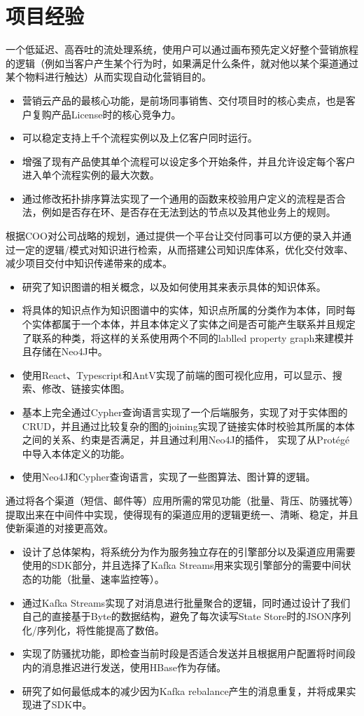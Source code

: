\documentclass{resume}
\begin{document}
\section{项目经验}
一个低延迟、高吞吐的流处理系统，使用户可以通过画布预先定义好整个营销旅程的逻辑（例如当客户产生某个行为时，如果满足什么条件，就对他以某个渠道通过某个物料进行触达）从而实现自动化营销目的。
\begin{itemize}[parsep=0.25ex]
\item 营销云产品的最核心功能，是前场同事销售、交付项目时的核心卖点，也是客户复购产品License时的核心竞争力。
\item 可以稳定支持上千个流程实例以及上亿客户同时运行。
\item 增强了现有产品使其单个流程可以设定多个开始条件，并且允许设定每个客户进入单个流程实例的最大次数。
\item 通过修改拓扑排序算法实现了一个通用的函数来校验用户定义的流程是否合法，例如是否存在环、是否存在无法到达的节点以及其他业务上的规则。
\end{itemize}
根据COO对公司战略的规划，通过提供一个平台让交付同事可以方便的录入并通过一定的逻辑/模式对知识进行检索，从而搭建公司知识库体系，优化交付效率、减少项目交付中知识传递带来的成本。
\begin{itemize}[parsep=0.25ex]
\item 研究了知识图谱的相关概念，以及如何使用其来表示具体的知识体系。
\item 将具体的知识点作为知识图谱中的实体，知识点所属的分类作为本体，同时每个实体都属于一个本体，并且本体定义了实体之间是否可能产生联系并且规定了联系的种类，将这样的关系使用两个不同的lablled property graph来建模并且存储在Neo4J中。
\item 使用React、Typescript和AntV实现了前端的图可视化应用，可以显示、搜索、修改、链接实体图。
\item 基本上完全通过Cypher查询语言实现了一个后端服务，实现了对于实体图的CRUD，并且通过比较复杂的图的joining实现了链接实体时校验其所属的本体之间的关系、约束是否满足，并且通过利用Neo4J的插件， 实现了从Protégé中导入本体定义的功能。
\item 使用Neo4J和Cypher查询语言，实现了一些图算法、图计算的逻辑。
\end{itemize}
通过将各个渠道（短信、邮件等）应用所需的常见功能（批量、背压、防骚扰等）提取出来在中间件中实现，使得现有的渠道应用的逻辑更统一、清晰、稳定，并且使新渠道的对接更高效。
\begin{itemize}[parsep=0.25ex]
\item 设计了总体架构，将系统分为作为服务独立存在的引擎部分以及渠道应用需要使用的SDK部分，并且选择了Kafka Streams用来实现引擎部分的需要中间状态的功能（批量、速率监控等）。
\item 通过Kafka Streams实现了对消息进行批量聚合的逻辑，同时通过设计了我们自己的直接基于Byte的数据结构，避免了每次读写State Store时的JSON序列化/序列化，将性能提高了数倍。
\item 实现了防骚扰功能，即检查当前时段是否适合发送并且根据用户配置将时间段内的消息推迟进行发送，使用HBase作为存储。
\item 研究了如何最低成本的减少因为Kafka rebalance产生的消息重复，并将成果实现进了SDK中。
\end{itemize}
\end{document}
